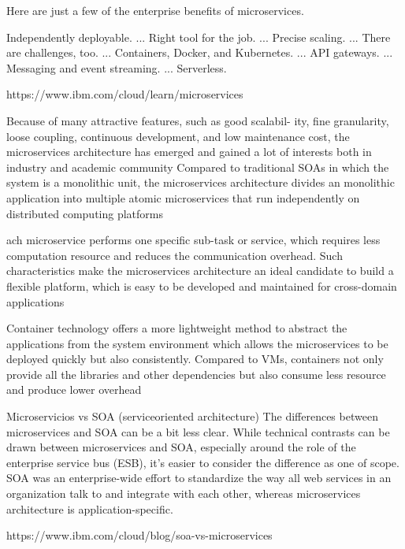 Here are just a few of the enterprise benefits of microservices.

Independently deployable. ...
Right tool for the job. ...
Precise scaling. ...
There are challenges, too. ...
Containers, Docker, and Kubernetes. ...
API gateways. ...
Messaging and event streaming. ...
Serverless.

https://www.ibm.com/cloud/learn/microservices



Because of many attractive features, such as good scalabil-
ity, fine granularity, loose coupling, continuous development,
and low maintenance cost, the microservices architecture has
emerged and gained a lot of interests both in industry and
academic community
Compared to traditional SOAs
in which the system is a monolithic unit, the microservices
architecture divides an monolithic application into multiple
atomic microservices that run independently on distributed
computing platforms

ach microservice performs one specific
sub-task or service, which requires less computation resource
and reduces the communication overhead. Such characteristics
make the microservices architecture an ideal candidate to
build a flexible platform, which is easy to be developed and
maintained for cross-domain applications


Container technology offers a more lightweight method to
abstract the applications from the system environment which
allows the microservices to be deployed quickly but also
consistently. Compared to VMs, containers not only provide
all the libraries and other dependencies but also consume less
resource and produce lower overhead







Microservicios vs SOA (serviceoriented architecture)
The differences between microservices and SOA can be a bit less clear. While technical contrasts can be drawn between microservices and SOA, especially around the role of the enterprise service bus (ESB), it’s easier to consider the difference as one of scope. SOA was an enterprise-wide effort to standardize the way all web services in an organization talk to and integrate with each other, whereas microservices architecture is application-specific.

https://www.ibm.com/cloud/blog/soa-vs-microservices

